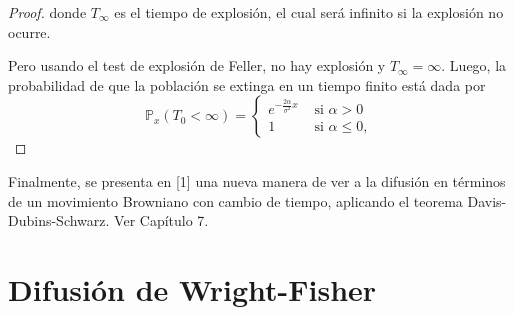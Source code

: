 \documentclass[letterpaper]{article}
\renewcommand{\P}{\mathbb{P}}
\newcommand{\1}{\mathds{1}}
\theoremstyle{definition}
\theoremstyle{definition}
\theoremstyle{definition}
\theoremstyle{definition}
\theoremstyle{definition}
\begin{document}
\begin{proof}
    donde $T_\infty$ es el tiempo de explosión, el cual será infinito si la explosión no ocurre.
    \newline

    Pero usando el test de explosión de Feller, no hay explosión y $T_\infty=\infty$. Luego, la probabilidad de que la población se 
    extinga en un tiempo finito está dada por 
    \[
        \P_x(T_0<\infty)=\begin{cases}
            e^{-\frac{2\alpha}{\sigma^2}x} & \text{ si } \alpha>0\\
            1 & \text{ si } \alpha\leq 0,
        \end{cases}
    \]
  \end{proof}
  Finalmente, se presenta en [1] una nueva manera de ver a la difusión en términos de un movimiento Browniano con cambio de tiempo, aplicando
  el teorema Davis-Dubins-Schwarz. Ver Capítulo 7.
  
\section*{Difusión de Wright-Fisher}
\end{document}
